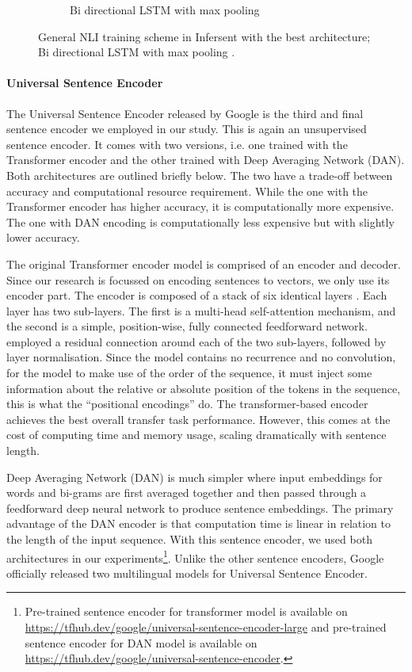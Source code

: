\begin{figure}
\begin{subfigure}[b]{.5\textwidth}
		\caption{Bi directional LSTM  with max pooling}
		\label{fig:infersent_architecture}
	\end{subfigure}
	\caption[Infersent Architecture]{General NLI training scheme in Infersent with the best architecture; Bi directional LSTM  with max pooling \autocite{conneau-EtAl:2017:EMNLP2017}. }
	\label{fig:infersent}
\end{figure}

\paragraph{Universal Sentence Encoder}

The Universal Sentence Encoder \autocite{cer2018universal} released by Google is the third and final sentence encoder we employed in our study. This is again an unsupervised sentence encoder. It comes with two versions, i.e. one trained with the Transformer encoder and the other trained with Deep Averaging Network (DAN). Both architectures are outlined briefly below. The two have a trade-off between accuracy and computational resource requirement. While the one with the Transformer encoder has higher accuracy, it is computationally more expensive. The one with DAN encoding is computationally less expensive but with slightly lower accuracy.

The original Transformer encoder model is comprised of an encoder and decoder. Since our research is focussed on encoding sentences to vectors, we only use its encoder part. The encoder is composed of a stack of six identical layers \autocite{cer2018universal}. Each layer has two sub-layers. The first is a multi-head self-attention mechanism, and the second is a simple, position-wise, fully connected feedforward network. \textcite{cer2018universal} employed a residual connection around each of the two sub-layers,
followed by layer normalisation. Since the model contains no recurrence and no convolution, for the model to make use of the order of the sequence, it must inject some information about the relative or absolute position of the tokens in the sequence, this is what the “positional encodings” do. The transformer-based encoder achieves the best overall transfer task performance. However, this comes at the cost of computing time and memory usage, scaling dramatically with sentence length.

Deep Averaging Network (DAN) is much simpler where input embeddings for words and bi-grams are first averaged together and then passed through a feedforward deep neural network to produce sentence embeddings. The primary advantage of the DAN encoder is that computation time is linear in relation to the length of the input sequence. With this sentence encoder, we used both architectures in our experiments\footnote{Pre-trained sentence encoder for transformer model is available on \url{https://tfhub.dev/google/universal-sentence-encoder-large} and pre-trained sentence encoder for DAN model is available on \url{https://tfhub.dev/google/universal-sentence-encoder}.}. Unlike the other sentence encoders, Google officially released two multilingual models for Universal Sentence Encoder.


